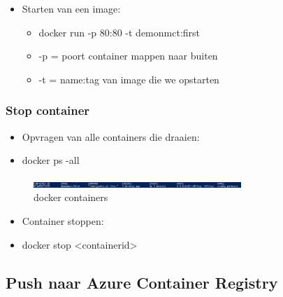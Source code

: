 \documentclass{article}
\begin{document}
\begin{itemize}
    \item Starten van een image:
    \begin{itemize}
        \item docker run -p 80:80 -t demonmct:first
        \item -p = poort container mappen naar buiten
        \item -t = name:tag van image die we opstarten
    \end{itemize}
\end{itemize}

\subsubsection{Stop container}

\begin{itemize}
    \item Opvragen van alle containers die draaien:
    \item docker ps -all
\end{itemize}

\begin{figure}[H]
    \centering
    \includegraphics[width=0.7\textwidth]{docker-runcontainer-2.png}
    \caption{docker containers}
\end{figure}

\begin{itemize}
    \item Container stoppen:
    \item docker stop <containerid>
\end{itemize}

\subsection{Push naar Azure Container Registry}
\end{document}

